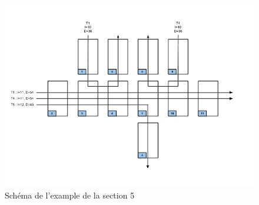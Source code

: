 \documentclass[a4paper,10pt]{article}
\title{}
\author{}
\date{}
\newenvironment{figureH} {%
\begin{figure}[H]
}{%
\end{figure}
}
\begin{document}
\maketitle
  \begin{figureH}
        \includegraphics[width=\textwidth]{images/global.png}
        \center
        \caption{Schéma de l'example de la section 5}
        \label{image_global}
    \end{figureH}
    
\end{document}
